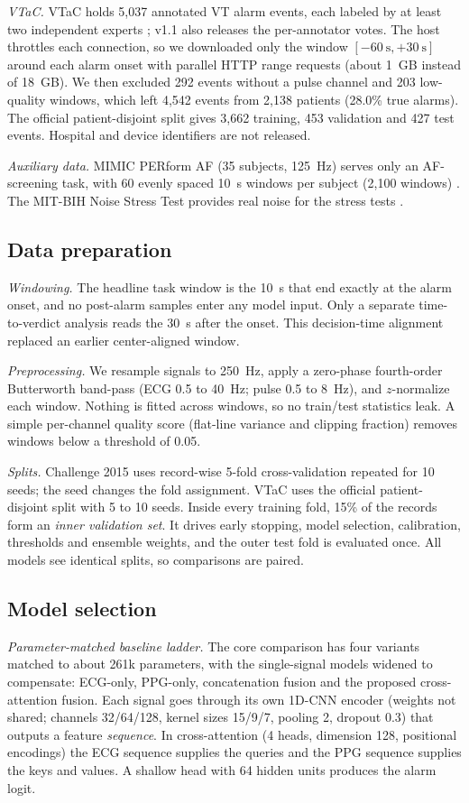 \documentclass[conference]{IEEEtran}
\begin{document}
\emph{VTaC.} VTaC holds 5,037 annotated VT alarm events, each labeled by at least two independent experts \cite{lehman2023vtac}; v1.1 also releases the per-annotator votes. The host throttles each connection, so we downloaded only the window $[-60~\mathrm{s},+30~\mathrm{s}]$ around each alarm onset with parallel HTTP range requests (about 1~GB instead of 18~GB). We then excluded 292 events without a pulse channel and 203 low-quality windows, which left 4,542 events from 2,138 patients (28.0\% true alarms). The official patient-disjoint split gives 3,662 training, 453 validation and 427 test events. Hospital and device identifiers are not released.

\emph{Auxiliary data.} MIMIC PERform AF (35 subjects, 125~Hz) serves only an AF-screening task, with 60 evenly spaced 10~s windows per subject (2,100 windows) \cite{charlton2025perform,charlton2022beats}. The MIT-BIH Noise Stress Test provides real noise for the stress tests \cite{moody1984nstdb}.

\subsection{Data preparation}
\emph{Windowing.} The headline task window is the 10~s that end exactly at the alarm onset, and no post-alarm samples enter any model input. Only a separate time-to-verdict analysis reads the 30~s after the onset. This decision-time alignment replaced an earlier center-aligned window.

\emph{Preprocessing.} We resample signals to 250~Hz, apply a zero-phase fourth-order Butterworth band-pass (ECG 0.5 to 40~Hz; pulse 0.5 to 8~Hz), and $z$-normalize each window. Nothing is fitted across windows, so no train/test statistics leak. A simple per-channel quality score (flat-line variance and clipping fraction) removes windows below a threshold of 0.05.

\emph{Splits.} Challenge 2015 uses record-wise 5-fold cross-validation repeated for 10 seeds; the seed changes the fold assignment. VTaC uses the official patient-disjoint split with 5 to 10 seeds. Inside every training fold, 15\% of the records form an \emph{inner validation set}. It drives early stopping, model selection, calibration, thresholds and ensemble weights, and the outer test fold is evaluated once. All models see identical splits, so comparisons are paired.

\subsection{Model selection}
\emph{Parameter-matched baseline ladder.} The core comparison has four variants matched to about 261k parameters, with the single-signal models widened to compensate: ECG-only, PPG-only, concatenation fusion and the proposed cross-attention fusion. Each signal goes through its own 1D-CNN encoder (weights not shared; channels 32/64/128, kernel sizes 15/9/7, pooling 2, dropout 0.3) that outputs a feature \emph{sequence}. In cross-attention (4 heads, dimension 128, positional encodings) the ECG sequence supplies the queries and the PPG sequence supplies the keys and values. A shallow head with 64 hidden units produces the alarm logit.
\end{document}
